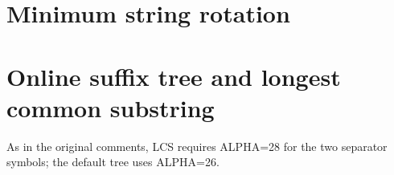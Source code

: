 \section{Minimum string rotation}

\section{Online suffix tree and longest common substring}
As in the original comments, LCS requires ALPHA=28 for the two separator symbols; the default tree uses ALPHA=26.

